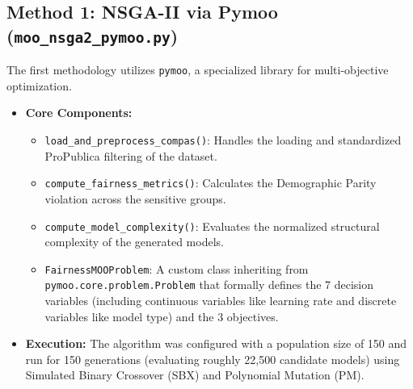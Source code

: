 \documentclass[12pt, a4paper]{article}
\begin{document}
\subsection{Method 1: NSGA-II via Pymoo (\texttt{moo\_nsga2\_pymoo.py})}
The first methodology utilizes \texttt{pymoo}, a specialized library for multi-objective optimization. 
\begin{itemize}
    \item \textbf{Core Components:}
    \begin{itemize}
        \item \texttt{load\_and\_preprocess\_compas()}: Handles the loading and standardized ProPublica filtering of the dataset.
        \item \texttt{compute\_fairness\_metrics()}: Calculates the Demographic Parity violation across the sensitive groups.
        \item \texttt{compute\_model\_complexity()}: Evaluates the normalized structural complexity of the generated models.
        \item \texttt{FairnessMOOProblem}: A custom class inheriting from \texttt{pymoo.core.problem.Problem} that formally defines the 7 decision variables (including continuous variables like learning rate and discrete variables like model type) and the 3 objectives.
    \end{itemize}
    \item \textbf{Execution:} The algorithm was configured with a population size of 150 and run for 150 generations (evaluating roughly 22,500 candidate models) using Simulated Binary Crossover (SBX) and Polynomial Mutation (PM).
\end{itemize}

\pagebreak
\end{document}
